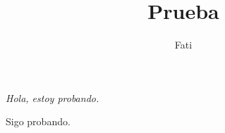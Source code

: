 \documentclass{article}
\begin{document}
\title{Prueba}
\author{Fati}
\maketitle
\emph{Hola, estoy probando.}

Sigo probando.  
\end{document}
